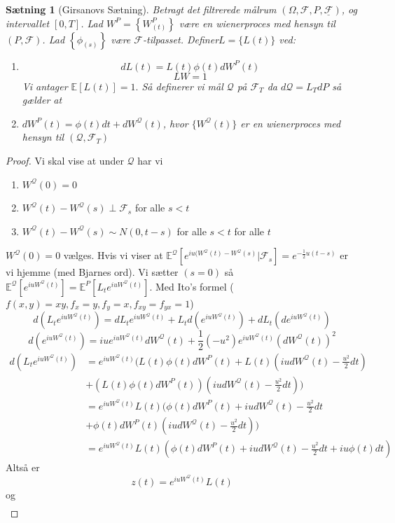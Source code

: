 \documentclass[12pt]{report}
\newtheorem{theorem}[lemma]{Sætning}
\theoremstyle{break}
\newtheorem*{proof}{Bevis}
\theoremstyle{break}
\newcommand{\EE}{\mathbb{E}}
\newcommand{\Q}{\mathcal{Q}}
\newcommand{\FI}{\mathcal{F}}
\newcommand{\FIU}{\underline{\mathcal{F}}}
\newcommand{\1}{\mathds{1}}
\begin{document}
\begin{theorem}[Girsanovs Sætning]
	Betragt det filtrerede målrum $(\Omega ,\FI,P,\FIU)$, og intervallet $[0,T]$. Lad $W^P=\left\{ W^P_{(t)} \right\}$ være en wienerproces med hensyn til $(P,\FI)$. Lad $\left\{ \phi_{(s)} \right\}$ være $\FI$-tilpasset. Definer$L=\{ L(t) \}$ ved:
	\begin{enumerate}[label=(\alph*)]
		\item \[dL(t)=L(t)\phi(t)dW^P(t)\] \[ LW=1 \] Vi antager $\EE[L(t)]=1.$ Så definerer vi mål $\Q$ på $\FI_T$ da $d\Q =L_T dP$ så gælder at
		\item $d W^P(t)=\phi(t)dt +dW^\Q(t)$, hvor $\{W^\Q(t)\}$ er en wienerproces med hensyn til $(\Q,\FI_T)$
	\end{enumerate}
\end{theorem}
\begin{proof}
	Vi skal vise at under $\Q$ har vi 
	\begin{enumerate}
		\item $W^\Q(0)=0$
		\item $W^\Q(t)-W^\Q(s)\perp\FI_s$ for alle $s<t$
		\item $W^\Q(t)-W^\Q(s)\sim N(0,t-s)$ for alle $s<t$ for alle $t$
	\end{enumerate}
	$W^\Q(0)=0$ vælges. Hvis vi viser at $\EE^\Q[e^{iu(W^\Q(t)-W^\Q(s)}\vert \FI_s]=e^{-\frac{1}{2}u(t-s)}$ er vi hjemme (med Bjarnes ord).
	Vi sætter $(s=0)$ så $\EE^\Q[e^{iuW^\Q(t)}]=\EE^P[L_te^{iuW^\Q(t)}]$. Med Ito's formel ($f(x,y)=xy, f_x=y,f_y=x,f_{xy}=f_{yx}=1$)
	\[ d\left(L_t e^{iuW^\Q(t)}\right)=dL_t e^{iuW^\Q(t)}+L_td\left( e^{iuW^\Q(t)} \right)+dL_t\left( de^{iuW^\Q(t)} \right) \]
	\[ d\left( e^{iuW^\Q(t)} \right)=iue^{iuW^\Q(t)}dW^\Q(t)+\frac{1}{2}\left(-u^2\right)e^{iuW^\Q(t)}\left(dW^\Q(t)\right)^2 \]
	\begin{align*}
		d\left( L_t e^{iuW^\Q(t)} \right)&=e^{iuW^\Q(t)}\Bigg( L(t)\phi(t)dW^P(t)+L(t)\left( iudW^\Q(t)-\frac{u^2}{2}dt  \right)\\		  
		&+\left( L(t)\phi(t)dW^P(t) \right)\left( iudW^\Q(t)-\frac{u^2}{2}dt \right)\Bigg)\\
		&=e^{iuW^\Q(t)} L(t) \Bigg( \phi(t)dW^P(t) + iudW^\Q(t)-\frac{u^2}{2}dt\\
		&+\phi(t)dW^P(t)\left(iudW^\Q(t)-\frac{u^2}{2}dt\right)\Bigg)\\
		&=e^{iuW^\Q(t)}L(t)\left( \phi(t)dW^P(t)+iudW^\Q(t)-\frac{u^2}{2}dt+iu\phi(t)dt \right)
	\end{align*}
	Altså er \[ z(t)=e^{iuW^\Q(t)}L(t) \]
	og
	\begin{align*}

\end{align*}
\end{proof}
\end{document}
